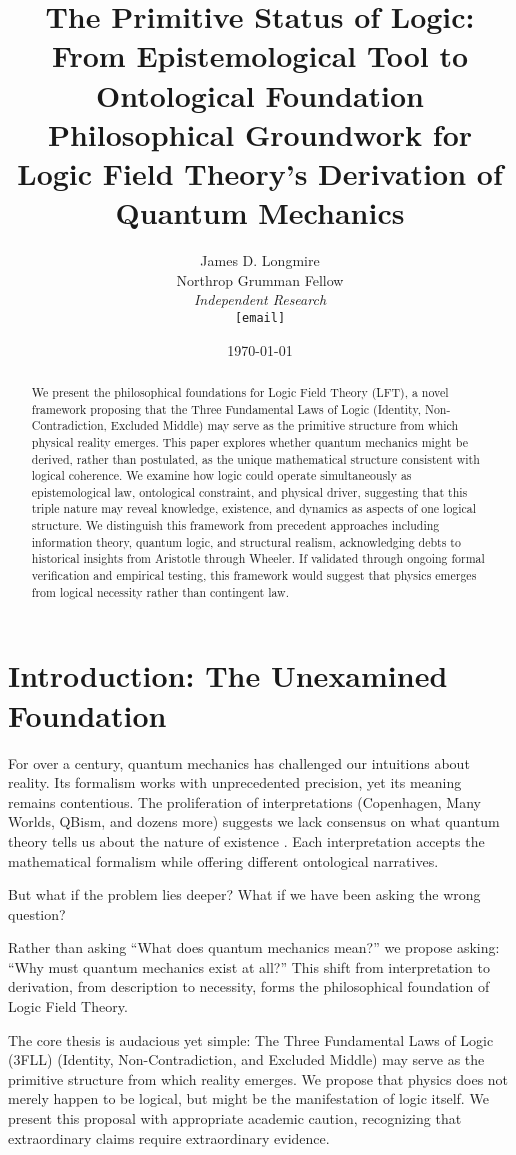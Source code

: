\documentclass[12pt,a4paper]{article}
\title{\textbf{The Primitive Status of Logic: From Epistemological Tool to Ontological Foundation}\\[0.5em]
\large Philosophical Groundwork for Logic Field Theory's Derivation of Quantum Mechanics}
\author{James D. Longmire\\
Northrop Grumman Fellow\\
\textit{Independent Research}\\
\texttt{[email]}}
\date{\today}
\begin{document}
\maketitle

\begin{abstract}
We present the philosophical foundations for Logic Field Theory (LFT), a novel framework proposing that the Three Fundamental Laws of Logic (Identity, Non-Contradiction, Excluded Middle) may serve as the primitive structure from which physical reality emerges. This paper explores whether quantum mechanics might be derived, rather than postulated, as the unique mathematical structure consistent with logical coherence. We examine how logic could operate simultaneously as epistemological law, ontological constraint, and physical driver, suggesting that this triple nature may reveal knowledge, existence, and dynamics as aspects of one logical structure. We distinguish this framework from precedent approaches including information theory, quantum logic, and structural realism, acknowledging debts to historical insights from Aristotle through Wheeler. If validated through ongoing formal verification and empirical testing, this framework would suggest that physics emerges from logical necessity rather than contingent law.
\end{abstract}

\section{Introduction: The Unexamined Foundation}

For over a century, quantum mechanics has challenged our intuitions about reality. Its formalism works with unprecedented precision, yet its meaning remains contentious. The proliferation of interpretations (Copenhagen, Many Worlds, QBism, and dozens more) suggests we lack consensus on what quantum theory tells us about the nature of existence \citep{maudlin2019philosophy}. Each interpretation accepts the mathematical formalism while offering different ontological narratives.

But what if the problem lies deeper? What if we have been asking the wrong question?

Rather than asking ``What does quantum mechanics mean?'' we propose asking: ``Why must quantum mechanics exist at all?'' This shift from interpretation to derivation, from description to necessity, forms the philosophical foundation of Logic Field Theory.

The core thesis is audacious yet simple: The Three Fundamental Laws of Logic (3FLL) (Identity, Non-Contradiction, and Excluded Middle) may serve as the primitive structure from which reality emerges. We propose that physics does not merely happen to be logical, but might be the manifestation of logic itself. We present this proposal with appropriate academic caution, recognizing that extraordinary claims require extraordinary evidence.
\end{document}
